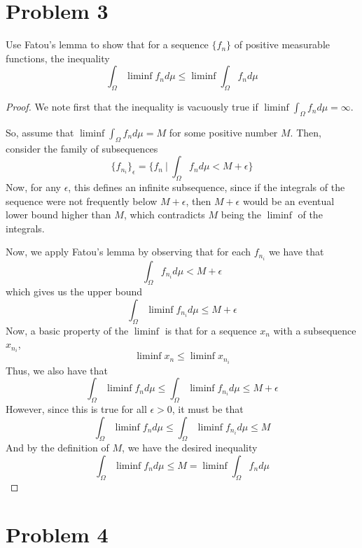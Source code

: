 \documentclass[fontsize=11pt]{scrartcl} %
\numberwithin{equation}{section} %
\numberwithin{figure}{section} %
\numberwithin{table}{section} %
\begin{document}
\section*{Problem 3}
Use Fatou's lemma to show that for a sequence $\{f_n\}$ of positive measurable functions,
the inequality
\[
\int_{\Omega}\liminf f_nd\mu \leq \liminf\int_{\Omega} f_nd\mu
\]

\begin{proof}
We note first that the inequality is vacuously true if $\liminf\int_{\Omega}f_nd\mu = \infty$.

So, assume that $\liminf\int_{\Omega}f_nd\mu = M$ for some positive number $M$. Then,
consider the family of subsequences
\[
\{f_{n_i}\}_{\epsilon} = \{f_n\ |\ \int_{\Omega} f_nd\mu < M+\epsilon\}
\]
Now, for any $\epsilon$, this defines an infinite subsequence, since if the integrals of
the sequence were not frequently below $M+\epsilon$, then $M+\epsilon$ would be an
eventual lower bound higher than $M$, which contradicts $M$ being the $\liminf$ of the
integrals.

Now, we apply Fatou's lemma by observing that for each $f_{n_i}$ we have that
\[
\int_{\Omega} f_{n_i}d\mu < M+\epsilon
\]
which gives us the upper bound
\[
\int_{\Omega}\liminf f_{n_i}d\mu \leq M+\epsilon
\]
Now, a basic property of the $\liminf$ is that for a sequence $x_n$ with a subsequence
$x_{n_i}$,
\[
\liminf x_n \leq \liminf x_{n_i}
\]
Thus, we also have that
\[
\int_{\Omega} \liminf f_nd\mu \leq \int_{\Omega}\liminf f_{n_i} d\mu\leq M+\epsilon
\]
However, since this is true for all $\epsilon > 0$, it must be that
\[
\int_{\Omega} \liminf f_nd\mu \leq \int_{\Omega}\liminf f_{n_i} d\mu\leq M
\]
And by the definition of $M$, we have the desired inequality
\[
\int_{\Omega} \liminf f_nd\mu \leq M = \liminf\int_{\Omega}f_nd\mu
\]

\end{proof}

\pagebreak
\section*{Problem 4}
\end{document}

